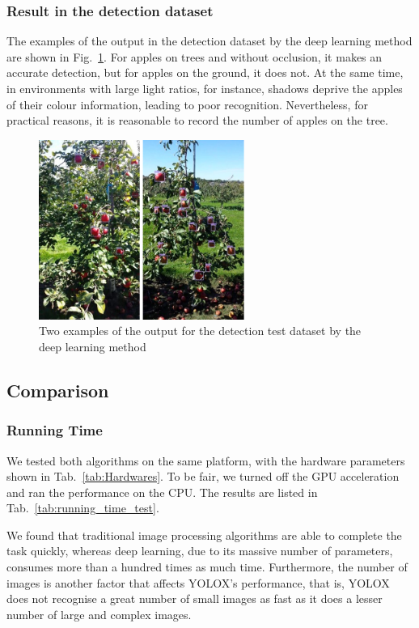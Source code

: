 \subsubsection{Result in the detection dataset}
The examples of the output in the detection dataset by the deep learning method are shown in Fig.~\ref{fig:result_detect_YOLO}. For apples on trees and without occlusion, it makes an accurate detection, but for apples on the ground, it does not. At the same time, in environments with large light ratios, for instance, shadows deprive the apples of their colour information, leading to poor recognition. Nevertheless, for practical reasons, it is reasonable to record the number of apples on the tree. 

\begin{figure}[!ht]
    \centering
    \includegraphics[width=0.6\textwidth]{images/result_YOLO_detect.png}
    \caption{Two examples of the output for the detection test dataset by the deep learning method}
    \label{fig:result_detect_YOLO}
\end{figure}


\subsection{Comparison}

\subsubsection{Running Time}
We tested both algorithms on the same platform, with the hardware parameters shown in Tab.~\ref{tab:Hardwares}. To be fair, we turned off the GPU acceleration and ran the performance on the CPU. The results are listed in Tab.~\ref{tab:running_time_test}.

We found that traditional image processing algorithms are able to complete the task quickly, whereas deep learning, due to its massive number of parameters, consumes more than a hundred times as much time. Furthermore, the number of images is another factor that affects YOLOX's performance, that is, YOLOX does not recognise a great number of small images as fast as it does a lesser number of large and complex images. 

